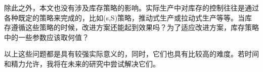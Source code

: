 除此之外，本文也没有涉及库存策略的影响。实际生产中对库存的控制往往是通过各种既定的策略来完成的，比如(s,S)策略，推动式生产或拉动式生产等等。当库存遵循这些策略的时候，改进方案还能起到效果吗？为了适应改进方案，库存策略中的一些参数应该取何值？

以上这些问题都是具有较强实际意义的，同时，它们也具有比较高的难度。若时间和精力允许，我将在未来的研究中尝试解决它们。





























